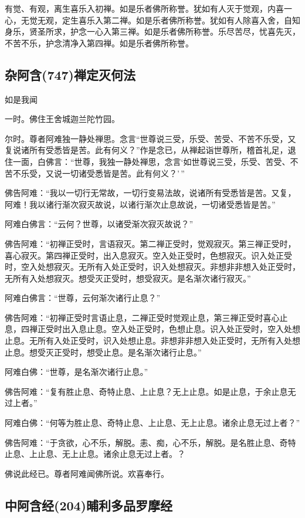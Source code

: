 \documentclass{book}
\begin{document}
有觉、有观，离生喜乐入初禅。如是乐者佛所称誉。犹如有人灭于觉观，内喜一心，无觉无观，定生喜乐入第二禅。如是乐者佛所称誉。犹如有人除喜入舍，自知身乐，贤圣所求，护念一心入第三禅。如是乐者佛所称誉。乐尽苦尽，忧喜先灭，不苦不乐，护念清净入第四禅。如是乐者佛所称誉。

\subsection{杂阿含(747)禅定灭何法}

如是我闻

一时。佛住王舍城迦兰陀竹园。

尔时。尊者阿难独一静处禅思。念言``世尊说三受，乐受、苦受、不苦不乐受，又复说诸所有受悉皆是苦。此有何义？''作是念已，从禅起诣世尊所，稽首礼足，退住一面，白佛言：``世尊，我独一静处禅思，念言`如世尊说三受，乐受、苦受、不苦不乐受，又说一切诸受悉皆是苦。此有何义？'\,''

佛告阿难：``我以一切行无常故，一切行变易法故，说诸所有受悉皆是苦。又复，阿难！我以诸行渐次寂灭故说，以诸行渐次止息故说，一切诸受悉皆是苦。''

阿难白佛言：``云何？世尊，以诸受渐次寂灭故说？''

佛告阿难：``初禅正受时，言语寂灭。第二禅正受时，觉观寂灭。第三禅正受时，喜心寂灭。第四禅正受时，出入息寂灭。空入处正受时，色想寂灭。识入处正受时，空入处想寂灭。无所有入处正受时，识入处想寂灭。非想非非想入处正受时，无所有入处想寂灭。想受灭正受时，想受寂灭。是名渐次诸行寂灭。''

阿难白佛言：``世尊，云何渐次诸行止息？''

佛告阿难：``初禅正受时言语止息，二禅正受时觉观止息，第三禅正受时喜心止息，四禅正受时出入息止息。空入处正受时，色想止息。识入处正受时，空入处想止息。无所有入处正受时，识入处想止息。非想非非想入处正受时，无所有入处想止息。想受灭正受时，想受止息。是名渐次诸行止息。''

阿难白佛：``世尊，是名渐次诸行止息。''

佛告阿难：``复有胜止息、奇特止息、上止息？无上止息。如是止息，于余止息无过上者。''

阿难白佛：``何等为胜止息、奇特止息、上止息、无上止息。诸余止息无过上者？''

佛告阿难：``于贪欲，心不乐，解脱。恚、痴，心不乐，解脱。是名胜止息、奇特止息、上止息、无上止息。诸余止息无过上者。？

佛说此经已。尊者阿难闻佛所说。欢喜奉行。

\subsection{中阿含经(204)晡利多品罗摩经}
\end{document}
